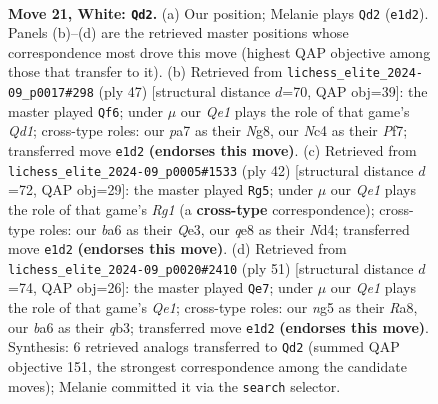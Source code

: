 \documentclass[11pt]{article}
\begin{document}
\clearpage

\begin{figure}[p]\centering
\begin{subfigure}{0.46\textwidth}\centering
\resizebox{\linewidth}{!}{%
\newchessgame
\chessboard[
  setfen={1r2q1k1/p1pp1ppp/b7/6n1/1pNP4/1P6/P1P1BP1P/1R2Q1K1 w - - 4 21},
  showmover=false,
  pgfstyle=straightmove, color=movearrow, markmove={e1-d2}
]}
\caption{}
\end{subfigure}\hfill
\begin{subfigure}{0.46\textwidth}\centering
\resizebox{\linewidth}{!}{%
\newchessgame
\chessboard[
  setfen={1r1q1kn1/2p2p1R/pb1p4/np1P4/3P4/4R3/1P3PPP/1N1Q2K1 b - - 2 24},
  showmover=false,
  pgfstyle=straightmove, color=movearrow, markmove={d8-f6}
]}
\caption{}
\end{subfigure}
\\[4pt]
\begin{subfigure}{0.46\textwidth}\centering
\resizebox{\linewidth}{!}{%
\newchessgame
\chessboard[
  setfen={r1b5/pp2kp2/4pq2/2Ppn2p/3N4/2P1Q2P/PP3P2/6RK w - - 5 22},
  showmover=false,
  pgfstyle=straightmove, color=movearrow, markmove={g1-g5}
]}
\caption{}
\end{subfigure}\hfill
\begin{subfigure}{0.46\textwidth}\centering
\resizebox{\linewidth}{!}{%
\newchessgame
\chessboard[
  setfen={r3q1k1/pp4pp/2p2p2/3n4/3P4/PQ1B2P1/1P3PP1/R5K1 b - - 0 26},
  showmover=false,
  pgfstyle=straightmove, color=movearrow, markmove={e8-e7}
]}
\caption{}
\end{subfigure}
\caption{\textbf{Move 21, White: \texttt{Qd2}.} (a) Our position; Melanie plays \texttt{Qd2} (\texttt{e1d2}). Panels (b)--(d) are the retrieved master positions whose correspondence most drove this move (highest QAP objective among those that transfer to it). (b) Retrieved from \texttt{lichess\_elite\_2024-09\_p0017\#298} (ply 47) [structural distance $d$=70, QAP obj=39]: the master played \texttt{Qf6}; under $\mu$ our \emph{Qe1} plays the role of that game's \emph{Qd1}; cross-type roles: our \emph{p}a7 as their \emph{N}g8, our \emph{N}c4 as their \emph{P}f7; transferred move \texttt{e1d2} \textbf{(endorses this move)}. (c) Retrieved from \texttt{lichess\_elite\_2024-09\_p0005\#1533} (ply 42) [structural distance $d$=72, QAP obj=29]: the master played \texttt{Rg5}; under $\mu$ our \emph{Qe1} plays the role of that game's \emph{Rg1} (a \textbf{cross-type} correspondence); cross-type roles: our \emph{b}a6 as their \emph{Q}e3, our \emph{q}e8 as their \emph{N}d4; transferred move \texttt{e1d2} \textbf{(endorses this move)}. (d) Retrieved from \texttt{lichess\_elite\_2024-09\_p0020\#2410} (ply 51) [structural distance $d$=74, QAP obj=26]: the master played \texttt{Qe7}; under $\mu$ our \emph{Qe1} plays the role of that game's \emph{Qe1}; cross-type roles: our \emph{n}g5 as their \emph{R}a8, our \emph{b}a6 as their \emph{q}b3; transferred move \texttt{e1d2} \textbf{(endorses this move)}. Synthesis: 6 retrieved analogs transferred to \texttt{Qd2} (summed QAP objective 151, the strongest correspondence among the candidate moves); Melanie committed it via the \texttt{search} selector.}
\label{fig:thought-m40}
\end{figure}
\end{document}
